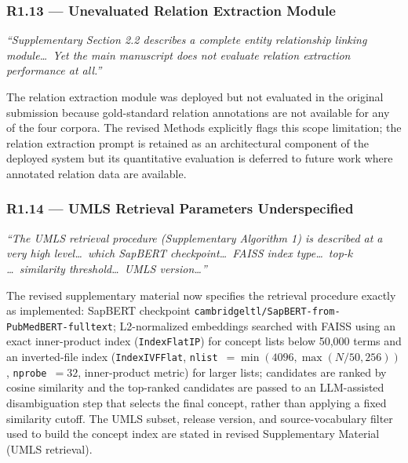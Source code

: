 \documentclass[11pt,letterpaper]{article}
\newcommand{\reviewer}[1]{\par\medskip\textcolor{blue!75!black}{\textit{#1}}\par\medskip}
\newcommand{\response}[1]{\par#1\par\medskip}
\begin{document}
\subsubsection*{R1.13 --- Unevaluated Relation Extraction Module}
\reviewer{``Supplementary Section 2.2 describes a complete entity relationship linking module\dots\ Yet the main manuscript does not evaluate relation extraction performance at all.''}
\response{The relation extraction module was deployed but not evaluated in the original submission because gold-standard relation annotations are not available for any of the four corpora. The revised Methods explicitly flags this scope limitation; the relation extraction prompt is retained as an architectural component of the deployed system but its quantitative evaluation is deferred to future work where annotated relation data are available.}

\subsubsection*{R1.14 --- UMLS Retrieval Parameters Underspecified}
\reviewer{``The UMLS retrieval procedure (Supplementary Algorithm 1) is described at a very high level\dots\ which SapBERT checkpoint\dots\ FAISS index type\dots\ top-$k$\dots\ similarity threshold\dots\ UMLS version\dots''}
\response{The revised supplementary material now specifies the retrieval procedure exactly as implemented: SapBERT checkpoint \nolinkurl{cambridgeltl/SapBERT-from-PubMedBERT-fulltext}; L2-normalized embeddings searched with FAISS using an exact inner-product index (\texttt{IndexFlatIP}) for concept lists below 50{,}000 terms and an inverted-file index (\texttt{IndexIVFFlat}, \texttt{nlist}~$=\min(4096,\max(N/50,256))$, \texttt{nprobe}~$=32$, inner-product metric) for larger lists; candidates are ranked by cosine similarity and the top-ranked candidates are passed to an LLM-assisted disambiguation step that selects the final concept, rather than applying a fixed similarity cutoff. The UMLS subset, release version, and source-vocabulary filter used to build the concept index are stated in revised Supplementary Material (UMLS retrieval).}
\end{document}
